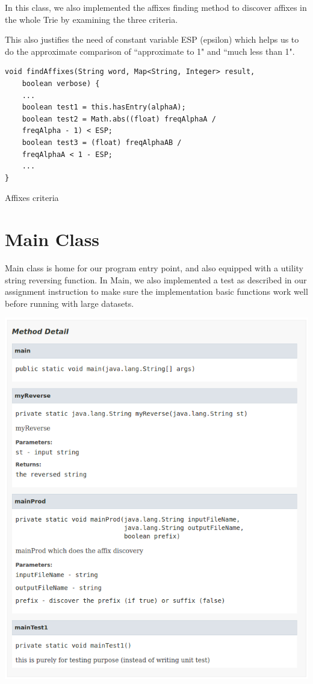 \documentclass[12pt]{article}
\begin{document}
In this class, we also implemented the affixes finding method to discover affixes in the whole Trie by examining the three criteria.

This also justifies the need of constant variable ESP (epsilon) which helps us to do the approximate comparison of ``approximate to 1" and ``much less than 1". 


\begin{listing}[H]
	\begin{verbatim}
void findAffixes(String word, Map<String, Integer> result,
	boolean verbose) {
	...
	boolean test1 = this.hasEntry(alphaA);
	boolean test2 = Math.abs((float) freqAlphaA / 
	freqAlpha - 1) < ESP;
	boolean test3 = (float) freqAlphaAB / 
	freqAlphaA < 1 - ESP;
	...
}
	\end{verbatim}
	\caption{Affixes criteria}
\end{listing}

\section{Main Class}


Main class is home for our program entry point, and also equipped with a utility string reversing function. In Main, we also implemented a test as described in our assignment instruction to make sure the implementation basic functions work well before running with large datasets.

\begin{center}
	\includegraphics[width=\textwidth]{main_methods}
\end{center}
\end{document}
